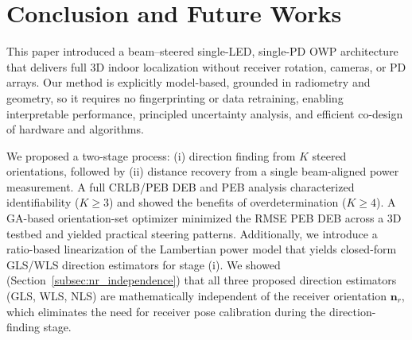 \documentclass[journal]{IEEEtran}
\newcommand{\added}[1]{{\color{blue}#1}}
\newcommand{\deleted}[1]{{\color{red}#1}}
\begin{document}
\section{Conclusion and Future Works}
\label{sec:Conclusion}

This paper introduced a beam–steered single-LED, single-PD OWP architecture that delivers full 3D indoor localization without receiver rotation, cameras, or PD arrays. Our method is explicitly model-based, grounded in radiometry and geometry, so it requires no fingerprinting or data retraining, enabling interpretable performance, principled uncertainty analysis, and efficient co-design of hardware and algorithms.

We proposed a two-stage process: (i) direction finding from \(K\) steered orientations, followed by (ii) distance recovery from a single beam-aligned power measurement. A full \deleted{CRLB/PEB} \added{DEB and PEB} analysis characterized identifiability (\(K\!\ge\!3\)) and showed the benefits of overdetermination (\(K\!\ge\!4\)). A GA-based orientation-set optimizer minimized the RMSE \deleted{PEB} \added{DEB} across a 3D testbed and yielded practical steering patterns. Additionally, we introduce a ratio-based linearization of the Lambertian power model that yields closed-form GLS/WLS direction estimators for stage (i). \added{We showed (Section~\ref{subsec:nr_independence}) that all three proposed direction estimators (GLS, WLS, NLS) are mathematically independent of the receiver orientation $\mathbf{n}_r$, which eliminates the need for receiver pose calibration during the direction-finding stage.}
\end{document}
